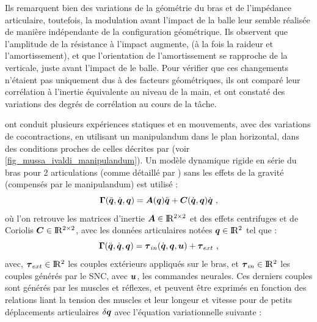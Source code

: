 Ils remarquent bien des variations de la géométrie du bras et de l'impédance articulaire, toutefois, la modulation avant l'impact de la balle leur semble réalisée de manière indépendante de la configuration géométrique. Ils observent que l'amplitude de la résistance à l'impact augmente, (à la fois la raideur et l'amortissement), et que l'orientation de l'amortissement se rapproche de la verticale, juste avant l'impact de le balle. Pour vérifier que ces changements n'étaient pas uniquement dus à des facteurs géométriques, ils ont comparé leur corrélation à l'inertie équivalente au niveau de la main, et ont constaté des variations des degrés de corrélation au cours de la tâche. 

\textcite{gomi_human_1997,gomi_task-dependent_1998} ont conduit plusieurs expériences statiques et en mouvements, avec des variations de cocontractions, en utilisant un manipulandum dans le plan horizontal, dans des conditions proches de celles décrites par \textcite{mussa-ivaldi_neural_1985} (voir \cref{fig_mussa_ivaldi_manipulandum}). Un modèle dynamique rigide en série du bras pour 2 articulations (comme détaillé par \textcite[Chapitre~9]{khalil_modeling_2002}) sans les effets de la gravité (compensés par le manipulandum) est utilisé :
%
\begin{equation} \label{eq_arm_dynamic_model}
	\matr{\Gamma}(\ddot{\vect{q}}, \dot{\vect{q}}, \vect{q}) = \matr{A}(\vect{q})\ddot{\vect{q}} + \matr{C}(\dot{\vect{q}},\vect{q}) \dot{\vect{q}} \text{ ,}
\end{equation}
%
où l'on retrouve les matrices d'inertie $\matr{A}\in\Re^{2\times2}$ %
et des effets centrifuges et de Coriolis $\matr{C}\in\Re^{2\times2}$, avec les données articulaires notées $\vect{q}\in\Re^{2}$ tel que :
%
\begin{equation} \label{eq_joint_KBM_model_gomi}
	\matr{\Gamma}(\ddot{\vect{q}}, \dot{\vect{q}}, \vect{q}) = \vect{\tau}_{in}(\dot{\vect{q}}, \vect{q}, \vect{u}) + \vect{\tau}_{ext} \text{ ,}
\end{equation}
%
avec, $ \vect{\tau}_{ext}\in\Re^{2}$ les couples extérieurs appliqués sur le bras, et $ \vect{\tau}_{in}\in\Re^{2}$ les couples générés par le SNC, avec $ \vect{u} $, les commandes neurales. Ces derniers couples sont générés par les muscles et réflexes, et peuvent être exprimés en fonction des relations liant la tension des muscles et leur longeur et vitesse pour de petits déplacements articulaires $\delta\vect{q}$ avec l'équation variationnelle suivante :

